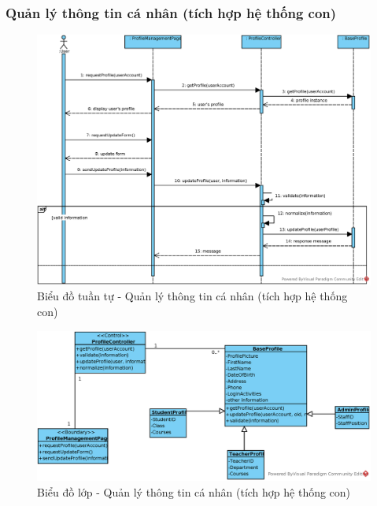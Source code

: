 \documentclass[./../main.tex]{subfiles}
\begin{document}
\subsubsection{Quản lý thông tin cá nhân (tích hợp hệ thống con)}
\begin{figure}[H]
    \centering
    \includegraphics[width=\linewidth]{./images/UseCaseDesignDiagram/ucr_ss_update_profile.eps}
    \caption{Biểu đồ tuần tự - Quản lý thông tin cá nhân (tích hợp hệ thống con)}
\end{figure}
\begin{figure}[H]
    \centering
    \includegraphics[width=\linewidth]{./images/UseCaseDesignDiagram/ucd_ss_profile.eps}
    \caption{Biểu đồ lớp - Quản lý thông tin cá nhân (tích hợp hệ thống con)}
\end{figure}
\end{document}
